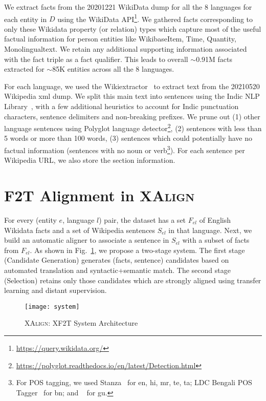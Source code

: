 \documentclass[11pt]{article}
\def\langCount{8}
\begin{document}
We extract facts from the 20201221 WikiData dump for all the \langCount{} languages for each entity in $D$ using the WikiData API\footnote{\url{https://query.wikidata.org/}}. We gathered facts corresponding to only these Wikidata property (or relation) types which capture most of the useful factual information for person entities like WikibaseItem, Time, Quantity, Monolingualtext. We retain any additional supporting information associated with the fact triple as a fact qualifier. This leads to overall  $\sim$0.91M facts extracted for $\sim$85K entities across all the \langCount{} languages. 

For each language, we used the Wikiextractor~\cite{Wikiextractor2015} to extract text from the 20210520 Wikipedia xml dump. We split this main text into sentences using the Indic NLP Library~\cite{kunchukuttan2020indicnlp}, with a few additional heuristics to account for Indic punctuation characters, sentence delimiters and non-breaking prefixes. We prune out (1) other language sentences using Polyglot language detector\footnote{\url{https://polyglot.readthedocs.io/en/latest/Detection.html}}, (2)  sentences with less than 5 words or more than 100 words, (3) sentences which could potentially have no factual information (sentences with no noun or verb\footnote{For POS tagging, we used Stanza~\cite{qi2020stanza} for en, hi, mr, te, ta; LDC Bengali POS Tagger~\cite{bali2010indian} for bn; and ~\cite{patel2008part} for gu.}). For each sentence per Wikipedia URL, we also store the section information.

\section{F2T Alignment in \textsc{XAlign}}
\label{sec:alignment}
For every (entity $e$, language $l$) pair, the dataset has a set $F_{el}$ of English Wikidata facts and a set of Wikipedia sentences $S_{el}$ in that language. Next, we build an automatic aligner to associate a sentence in $S_{el}$ with a subset of facts from $F_{el}$. As shown in Fig.~\ref{fig:system}, we propose a two-stage system. The first stage (Candidate Generation) generates (facts, sentence) candidates based on automated translation and syntactic+semantic match. The second stage (Selection) retains only those candidates which are strongly aligned using transfer learning and distant supervision.

\begin{figure}[!t]
    \centering
    \texttt{[image: system]}
    \caption{\textsc{XAlign}: XF2T System Architecture}
    \label{fig:system}
\end{figure}
\end{document}
